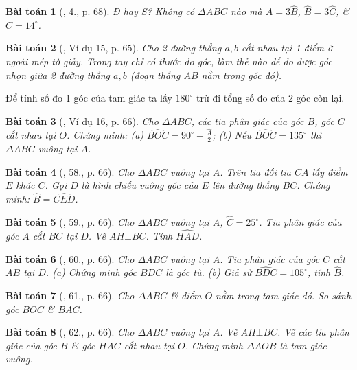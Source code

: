 \documentclass{article}
\newtheorem{baitoan}{Bài toán}
\begin{document}
\begin{baitoan}[\cite{SBT_Toan_7_Canh_Dieu_tap_2}, 4., p. 68]
	Đ hay S? Không có $\Delta ABC$ nào mà $\widehat{A} = 3\widehat{B}$, $\widehat{B} = 3\widehat{C}$, \& $C = 14^\circ$.
\end{baitoan}

\begin{baitoan}[\cite{Tuyen_Toan_7}, Ví dụ 15, p. 65]
	Cho 2 đường thẳng $a,b$ cắt nhau tại 1 điểm ở ngoài mép tờ giấy. Trong tay chỉ có thước đo góc, làm thế nào để đo được góc nhọn giữa 2 đường thẳng $a,b$ (đoạn thẳng $AB$ nằm trong góc đó).
\end{baitoan}
Để tính số đo 1 góc của tam giác ta lấy $180^\circ$ trừ đi tổng số đo của 2 góc còn lại.

\begin{baitoan}[\cite{Tuyen_Toan_7}, Ví dụ 16, p. 66]
	Cho $\Delta ABC$, các tia phân giác của góc $B$, góc $C$ cắt nhau tại $O$. Chứng minh: (a) $\widehat{BOC} = 90^\circ + \frac{\widehat{A}}{2}$; (b) Nếu $\widehat{BOC} = 135^\circ$ thì $\Delta ABC$ vuông tại $A$.
\end{baitoan}

\begin{baitoan}[\cite{Tuyen_Toan_7}, 58., p. 66]
	Cho $\Delta ABC$ vuông tại $A$. Trên tia đối tia $CA$ lấy điểm $E$ khác $C$. Gọi $D$ là hình chiếu vuông góc của $E$ lên đường thẳng $BC$. Chứng minh: $\widehat{B} = \widehat{CED}$.
\end{baitoan}

\begin{baitoan}[\cite{Tuyen_Toan_7}, 59., p. 66]
	Cho $\Delta ABC$ vuông tại $A$, $\widehat{C} = 25^\circ$. Tia phân giác của góc $A$ cắt $BC$ tại $D$. Vẽ $AH\bot BC$. Tính $\widehat{HAD}$.
\end{baitoan}

\begin{baitoan}[\cite{Tuyen_Toan_7}, 60., p. 66]
	Cho $\Delta ABC$ vuông tại $A$. Tia phân giác của góc $C$ cắt $AB$ tại $D$. (a) Chứng minh góc $BDC$ là góc tù. (b) Giả sử $\widehat{BDC} = 105^\circ$, tính $\widehat{B}$.
\end{baitoan}

\begin{baitoan}[\cite{Tuyen_Toan_7}, 61., p. 66]
	Cho $\Delta ABC$ \& điểm $O$ nằm trong tam giác đó. So sánh góc $BOC$ \& $BAC$.
\end{baitoan}

\begin{baitoan}[\cite{Tuyen_Toan_7}, 62., p. 66]
	Cho $\Delta ABC$ vuông tại $A$. Vẽ $AH\bot BC$. Vẽ các tia phân giác của góc $B$ \& góc $HAC$ cắt nhau tại $O$. Chứng minh $\Delta AOB$ là tam giác vuông.
\end{baitoan}
\end{document}
